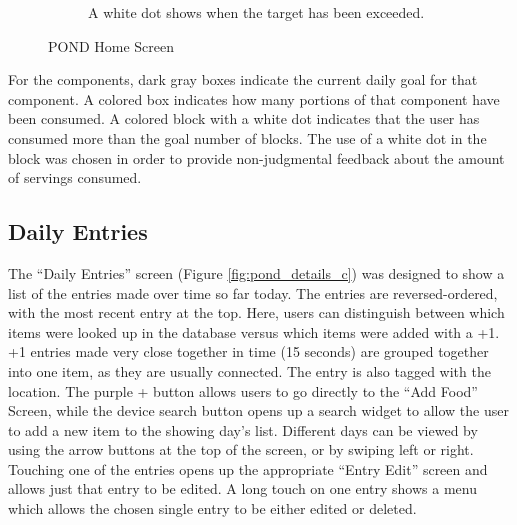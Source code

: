 \begin{figure}
\begin{subfigure}[t]{1.25in}
	\end{subfigure}
\quad
\begin{subfigure}[t]{1.25in}
		\centering
		\setlength\fboxsep{0pt}
\setlength\fboxrule{0.5pt}
		\caption{A white dot shows when the target has been exceeded. }\label{fig:pond_overview_d}
	\end{subfigure}

	\caption{POND Home Screen}\label{fig:POND_overview}
\end{figure}


For the components, dark gray boxes indicate the current daily goal for that component. A colored box indicates how many portions of that component have been consumed. A colored block with a white dot indicates that the user has consumed more than the goal number of blocks. The use of a white dot in the block was chosen in order to provide non-judgmental feedback about the amount of servings consumed. 

\subsection{Daily Entries}
The ``Daily Entries'' screen (Figure \ref{fig:pond_details_c}) was designed to show a list of the entries made over time so far today. The entries are reversed-ordered, with the most recent entry at the top. Here, users can distinguish between which items were looked up in the database versus which items were added with a +1. +1 entries made very close together in time (15 seconds) are grouped together into one item, as they are usually connected. The entry is also tagged with the location. 
The purple + button allows users to go directly to the ``Add Food'' Screen, while the device search button opens up a search widget to allow the user to add a new item to the showing day's list. Different days can be viewed by using the arrow buttons at the top of the screen, or by swiping left or right. Touching one of the entries opens up the appropriate ``Entry Edit'' screen and allows just that entry to be edited. A long touch on one entry shows a menu which allows the chosen single entry to be either edited or deleted. 

